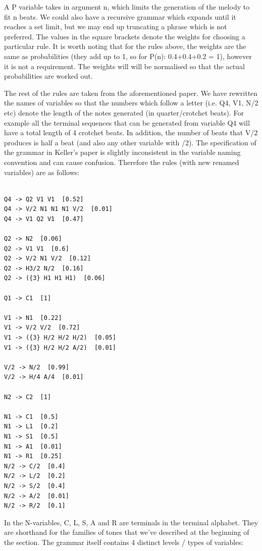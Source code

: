 \documentclass[pdftex,12pt,a4paper]{report}
\begin{document}
A P variable takes in argument n, which limits the generation of the melody to fit n beats. We could also have a recursive grammar which expands until it reaches a set limit, but we may end up truncating a phrase which is not preferred. The values in the square brackets denote the weights for choosing a particular rule. It is worth noting that for the rules above, the weights are the same as probabilities (they add up to 1, so for P(n):  0.4+0.4+0.2 = 1), however it is not a requirement. The weights will will be normalised so that the actual probabilities are worked out.

The rest of the rules are taken from the aforementioned paper. We have rewritten the names of variables so that the numbers which follow a letter (i.e. Q4, V1, N/2 etc) denote the length of the notes generated (in quarter/crotchet beats). For example all the terminal sequences that can be generated from variable Q4 will have a total length of 4 crotchet beats. In addition, the number of beats that V/2 produces is half a beat (and also any other variable with /2). The specification of the grammar in Keller's paper \cite{keller07} is slightly inconsistent in the variable naming convention and can cause confusion. Therefore the rules (with new renamed variables) are as follows:

\begin{verbatim}

Q4 -> Q2 V1 V1  [0.52]
Q4 -> V/2 N1 N1 N1 V/2  [0.01]
Q4 -> V1 Q2 V1  [0.47]

Q2 -> N2  [0.06]
Q2 -> V1 V1  [0.6]
Q2 -> V/2 N1 V/2  [0.12]
Q2 -> H3/2 N/2  [0.16]
Q2 -> ({3} H1 H1 H1)  [0.06]

Q1 -> C1  [1]

V1 -> N1  [0.22]
V1 -> V/2 V/2  [0.72]
V1 -> ({3} H/2 H/2 H/2)  [0.05]
V1 -> ({3} H/2 H/2 A/2)  [0.01]

V/2 -> N/2  [0.99]
V/2 -> H/4 A/4  [0.01]

N2 -> C2  [1]

N1 -> C1  [0.5]
N1 -> L1  [0.2]
N1 -> S1  [0.5]
N1 -> A1  [0.01]
N1 -> R1  [0.25]
N/2 -> C/2  [0.4]
N/2 -> L/2  [0.2]
N/2 -> S/2  [0.4]
N/2 -> A/2  [0.01]
N/2 -> R/2  [0.1]

\end{verbatim}

In the N-variables, C, L, S, A and R are terminals in the terminal alphabet. They are shorthand for the families of tones that we've described at the beginning of the section. The grammar itself contains 4 distinct levels / types of variables:
\end{document}
